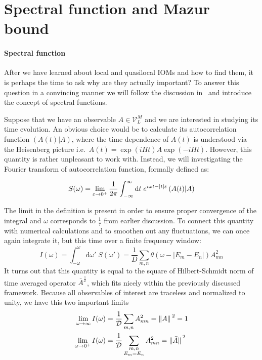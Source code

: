 
\section{Spectral function and Mazur bound\label{sec:spectral function}}

\paragraph{Spectral function}After we have learned about local and quasilocal IOMs and how to find them, it is perhaps the 
time to ask why are they actually important? To answer this question in a convincing manner we 
will follow the discussion in~\textcite{Vidmar2021} and introduce the concept of spectral
functions. 

Suppose that we have an observable \(A \in \mathcal{V}_L^M\) and we are interested in studying its time
evolution. An obvious choice would be to calculate its autocorrelation function
\((A(t)|A)\), where the time dependence of \(A(t)\) is understood
via the Heisenberg picture i.e.\ \(A(t) = \exp\left(i H t\right) A
\exp\left(-i H t\right)\). However, this quantity is rather unpleasant to work with.
Instead, we will investigating the Fourier transform of autocorrelation function, formally
defined as:
\begin{definition}  
  \begin{equation*}
  S(\omega) =  \lim _{\varepsilon \to 0^+} \frac{1}{2 \pi} \int_{-\infty}^{\infty} \mathrm{d} t 
  \; e^{i \omega t-|t| \varepsilon}\left(A(t) \middle| A\right)
  \end{equation*}
  \label{def:spectral function}
\end{definition}
The limit in the definition is present in order to ensure proper convergence of the integral
and \(\omega{}\) corresponds to \(\frac{1}{\tau}\) from earlier discussion.
To connect this quantity with numerical calculations and to smoothen out any fluctuations, we
can once again integrate it, but this time over a finite frequency window:
\begin{equation}
  I(\omega) = \int_{-\omega}^{\omega} \mathrm{d}\omega' \; S(\omega') = 
  \frac{1}{D} \sum_{m,n} \theta\left(\omega - |E_m-E_n|\right) A_{mn}^2
\end{equation}
It turns out that this quantity is equal to the square of Hilbert-Schmidt norm of time
averaged operator \(\bar{A}^{\frac{1}{\omega}}\), which fits nicely within the previously
discussed framework. Because all observables of interest are traceless and
normalized to unity, we have this two important limits
\begin{align}
  \lim_{\omega \to \infty } I(\omega) &= \frac{1}{\mathcal{D}}\sum_{m,n} A_{mn}^2 = \norm*{A}^2 = 1\\
  \lim_{\omega \to 0^+ } I(\omega) &= \frac{1}{\mathcal{D}} \sum_{ \substack{m,n\\E_m=E_n} } A_{mn}^2 = \norm*{\bar{A}}^2
\end{align}

